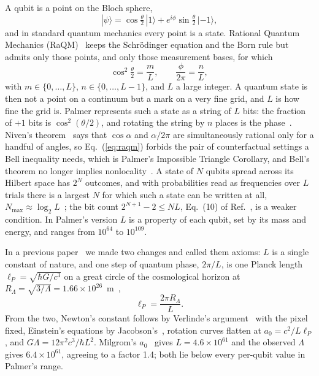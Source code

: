 \documentclass[aps,prd,twocolumn,superscriptaddress,nofootinbib]{revtex4-2}
\begin{document}
A qubit is a point on the Bloch sphere,
\begin{equation}
|\psi\rangle = \cos\tfrac{\theta}{2}\,|1\rangle + e^{i\phi}\sin\tfrac{\theta}{2}\,|{-1}\rangle ,
\label{eq:qubit}
\end{equation}
and in standard quantum mechanics every point is a state. Rational Quantum Mechanics (RaQM)~\cite{palmer2020,palmer2026,palmer2026b,palmer2026c} keeps the Schr\"odinger equation and the Born rule but admits only those points, and only those measurement bases, for which
\begin{equation}
\cos^2\tfrac{\theta}{2} = \frac{m}{L},\qquad \frac{\phi}{2\pi} = \frac{n}{L},
\label{eq:raqm}
\end{equation}
with $m\in\{0,\dots,L\}$, $n\in\{0,\dots,L-1\}$, and $L$ a large integer. A quantum state is then not a point on a continuum but a mark on a very fine grid, and $L$ is how fine the grid is. Palmer represents such a state as a string of $L$ bits: the fraction of $+1$ bits is $\cos^2(\theta/2)$, and rotating the string by $n$ places is the phase~\cite{palmer2026}. Niven's theorem~\cite{niven1956} says that $\cos\alpha$ and $\alpha/2\pi$ are simultaneously rational only for a handful of angles, so Eq.~(\ref{eq:raqm}) forbids the pair of counterfactual settings a Bell inequality needs, which is Palmer's Impossible Triangle Corollary, and Bell's theorem no longer implies nonlocality~\cite{palmer2020,palmer2026b}. A state of $N$ qubits spread across its Hilbert space has $2^N$ outcomes, and with probabilities read as frequencies over $L$ trials there is a largest $N$ for which such a state can be written at all, $N_{\max}\approx\log_2L$~\cite{palmer2026}; the bit count $2^{N+1}-2 \le NL$, Eq.~(10) of Ref.~\cite{palmer2026c}, is a weaker condition. In Palmer's version $L$ is a property of each qubit, set by its mass and energy, and ranges from $10^{64}$ to $10^{109}$.

In a previous paper~\cite{korytko2026} we made two changes and called them axioms: $L$ is a single constant of nature, and one step of quantum phase, $2\pi/L$, is one Planck length $\ell_P = \sqrt{\hbar G/c^3}$ on a great circle of the cosmological horizon at $R_\Lambda = \sqrt{3/\Lambda} = 1.66\times10^{26}$~m~\cite{planck2018},
\begin{equation}
\ell_P = \frac{2\pi R_\Lambda}{L} .
\label{eq:ident}
\end{equation}
From the two, Newton's constant follows by Verlinde's argument~\cite{verlinde2011} with the pixel fixed, Einstein's equations by Jacobson's~\cite{jacobson1995}, rotation curves flatten at $a_0 = c^2/L\ell_P$, and $G\Lambda = 12\pi^2c^3/\hbar L^2$. Milgrom's $a_0$~\cite{milgrom1983,mcgaugh2016} gives $L = 4.6\times10^{61}$ and the observed $\Lambda$ gives $6.4\times10^{61}$, agreeing to a factor 1.4; both lie below every per-qubit value in Palmer's range.
\end{document}
